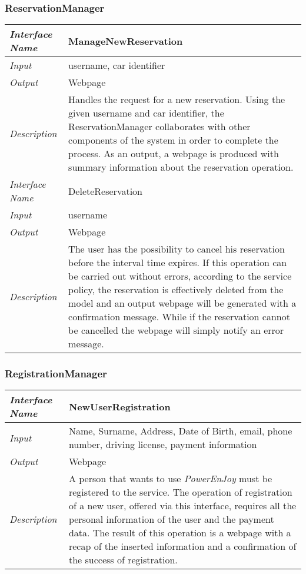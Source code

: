 \documentclass[11pt,a4paper]{report}
\begin{document}
\subsubsection{ReservationManager}
\begin{tabularx}{\textwidth}{|>{\em}l|X|}
	\hline
	Interface Name& ManageNewReservation\\
	\hline
	Input & username, car identifier\\
	\hline
	Output & Webpage\\
	\hline
	Description &Handles the request for a new reservation. Using the given username and car identifier, the ReservationManager collaborates with other components of the system in order to complete the process. As an output, a webpage is produced with summary information about the reservation operation.\\
	\hline \hline
	Interface Name& DeleteReservation\\
	\hline
	Input & username\\
	\hline
	Output & Webpage\\
	\hline
	Description &The user has the possibility to cancel his reservation before the interval time expires. If this operation can be carried out without errors, according to the service policy, the reservation is effectively deleted from the model and an output webpage will be generated with a confirmation message. While if the reservation cannot be cancelled the webpage will simply notify an error message.\\
	\hline
\end{tabularx}
\subsubsection{RegistrationManager}
\begin{tabularx}{\textwidth}{|>{\em}l|X|}
	\hline
	Interface Name& NewUserRegistration\\
	\hline
	Input& Name, Surname, Address, Date of Birth, email, phone number, driving license, payment information\\
	\hline
	Output & Webpage\\
	\hline
	Description &A person that wants to use \textit{PowerEnJoy} must be registered to the service. The operation of registration of a new user, offered via this interface, requires all the personal information of the user and the payment data. The result of this operation is a webpage with a recap of the inserted information and a confirmation of the success of registration.\\
	\hline
\end{tabularx}
\end{document}
